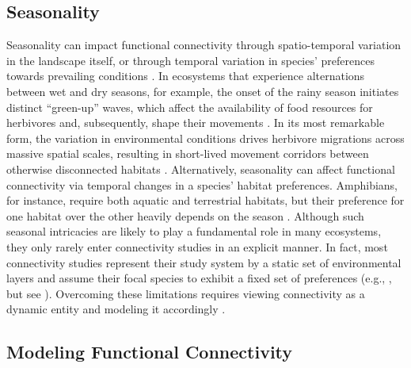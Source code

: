 \documentclass[abstract=on,10pt,a4paper,bibliography=totocnumbered]{article}
\begin{document}
\subsection{Seasonality}

Seasonality can impact functional connectivity through spatio-temporal variation
in the landscape itself, or through temporal variation in species' preferences
towards prevailing conditions \citep{Mui.2017, Simpkins.2017a, Zeller.2020a,
Forrest.2024}. In ecosystems that experience alternations between wet and dry
seasons, for example, the onset of the rainy season initiates distinct
``green-up'' waves, which affect the availability of food resources for
herbivores and, subsequently, shape their movements \citep{Merkle.2016}. In its
most remarkable form, the variation in environmental conditions drives herbivore
migrations across massive spatial scales, resulting in short-lived movement
corridors between otherwise disconnected habitats \citep{Serneels.2001,
Naidoo.2016}. Alternatively, seasonality can affect functional connectivity via
temporal changes in a species' habitat preferences. Amphibians, for instance,
require both aquatic and terrestrial habitats, but their preference for one
habitat over the other heavily depends on the season \citep{Baldwin.2006}.
Although such seasonal intricacies are likely to play a fundamental role in many
ecosystems, they only rarely enter connectivity studies in an explicit manner.
In fact, most connectivity studies represent their study system by a static set
of environmental layers and assume their focal species to exhibit a fixed set of
preferences (e.g., \citealp{Elliot.2014, Abrahms.2017, Brennan.2020}, but see
\citealp{Forrest.2024}). Overcoming these limitations requires viewing
connectivity as a dynamic entity and modeling it accordingly
\citep{Zeller.2020a}.

\subsection{Modeling Functional Connectivity}
\end{document}
